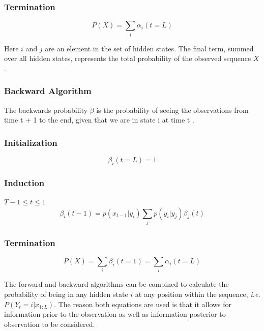 \subsubsection{Termination}
\begin{equation}
    P(X)= \sum_i{\alpha_i(t=L)}
\label{eq:fwdterm}
\end{equation}

Here $i$ and $j$ are an element in the set of hidden states. The final term, summed over all hidden states, represents the total probability of the observed sequence $X$ \cite{Rabiner1989ARecognition}.

\subsubsection{Backward Algorithm}
The backwards probability $\beta$ is the probability of seeing the observations from time t + 1 to the end, given
that we are in state i at time t \cite{Rabiner1989ARecognition}.

\subsubsection{Initialization}
\begin{equation}
    \beta_i(t=L) = 1
\label{eq:bwdinit}
\end{equation}

\subsubsection{Induction}
$T-1\leq t\leq 1$
\begin{equation}
\beta_i(t-1) =p(x_{t-1}|y_i)\sum_{j}{p(y_i|y_j)\beta_j(t)}
\label{eq:bwdinduc}
\end{equation}

\subsubsection{Termination}
\begin{equation}
    P(X)= \sum_i{\beta_i(t=1)} = \sum_i{\alpha_i(t=L)}
\label{eq:bwdterm}
\end{equation}

The forward and backward algorithms can be combined to calculate the probability of being in any hidden state $i$ at any position within the sequence, \emph{i.e.} $P(Y_t=i|x_{1:L})$. The reason both equations are used is that it allows for information prior to the observation as well as information posterior to observation to be considered. 

